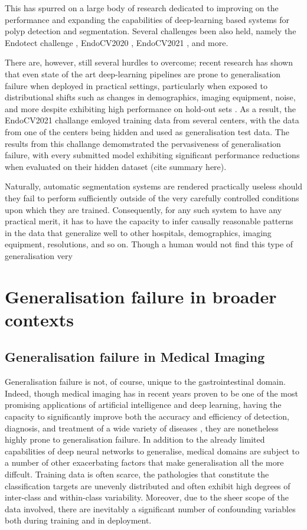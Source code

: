 	This has spurred on a large body of research dedicated to improving on the performance and expanding the capabilities of deep-learning based systems for polyp detection and segmentation. Several challenges been also held, namely the Endotect challenge \cite{endotect}, EndoCV2020 \cite{endocv2020}, EndoCV2021 \cite{endocv2021}, and more.
	
	There are, however, still several hurdles to overcome; recent research has shown that even state of the art deep-learning pipelines are prone to generalisation failure when deployed in practical settings, particularly when exposed to distributional shifts such as changes in demographics, imaging equipment, noise, and more despite exhibiting high performance on hold-out sets \cite{retinopathy, damour2020underspecification, pneumonia, shortcut_learning}. As a result, the EndoCV2021 challange emloyed training data from several centers, with the data from one of the centers being hidden and used as generalisation test data. The results from this challange demomstrated the pervasiveness of generalisation failure, with every submitted model exhibiting significant performance reductions when evaluated on their hidden dataset (cite summary here). 
	
	Naturally, automatic segmentation systems are rendered practically useless should they fail to perform sufficiently outside of the very carefully controlled conditions upon which they are trained. Consequently, for any such system to have any practical merit, it has to have the capacity to infer causally reasonable patterns in the data that generalize well to other hospitals, demographics, imaging equipment, resolutions, and so on. Though a human would not find this type of generalisation very 

\section{Generalisation failure in broader contexts} \label{case_studies}
	\subsection{Generalisation failure in Medical Imaging}
	Generalisation failure is not, of course, unique to the gastrointestinal domain. Indeed, though medical imaging has in recent years proven to be one of the most promising applications of artificial intelligence and deep learning, having the capacity to significantly improve both the accuracy and efficiency of detection, diagnosis, and treatment of a wide variety of diseases \cite{dl_medical_imaging}, they are nonetheless highly prone to generalisation failure. In addition to the already limited capabilities of deep neural networks to generalise, medical domains are subject to a number of other exacerbating factors that make generalisation all the more diffcult. Training data is often scarce, the pathologies that constitute the classification targets are unevenly distributed and often exhibit high degrees of inter-class and within-class variability. Moreover, due to the sheer scope of the data involved, there are inevitably a significant number of confounding variables both during training and in deployment.  
		

